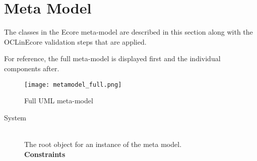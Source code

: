 \section{Meta Model}\label{metamodel}
The classes in the Ecore meta-model are described in this section along
with the OCLinEcore validation steps that are applied.

For reference, the full meta-model is displayed first and the individual
components after.
\begin{figure}[ph]
    \texttt{[image: metamodel\_full.png]}
    \caption{Full UML meta-model}
    \label{fig:fullmodel} %
\end{figure}

\begin{description}
    \item[System] \hfill \\
        The root object for an instance of the meta model. \\
        \textbf{Constraints} 
\end{description}
